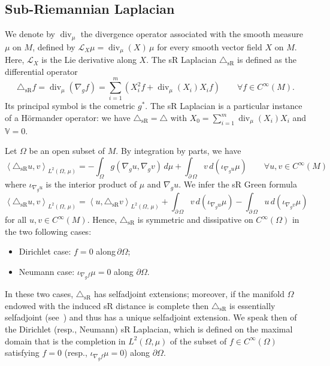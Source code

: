 \documentclass[AHL,Unicode,published]{cedram}
\newcommand{\bbV}{\mathbb{V}}
\newcommand{\calL}{\mathcal{L}}
\DeclareMathOperator{\divl}{div}
\newcommand{\trianglesR}{\triangle_{\mathrm{sR}}}
\let\oldforall\forall
\renewcommand*{\forall}{\mathrel{\oldforall}}
\begin{document}
\subsection{Sub-Riemannian Laplacian}\label{sec_sRLaplacian}
We denote by $\divl_\mu$ the divergence operator associated with the smooth measure $\mu$ on $M$, defined by $\calL_X \mu=\divl_\mu(X)\, \mu$ for every smooth vector field $X$ on $M$. Here, $\calL_X$ is the Lie derivative along $X$. The sR Laplacian $\trianglesR$ is defined as the differential operator
\begin{equation}\label{def_DeltasR}
\trianglesR f = \divl_\mu\left(\nabla_g f\right) = \sum_{i=1}^m \left(X_i^2f + \divl_\mu(X_i)X_if \right) \qquad \forall f\in C^\infty(M).
\end{equation}
Its principal symbol is the cometric $g^*$. The sR Laplacian is a particular instance of a H\"ormander operator: we have $\trianglesR=\triangle$ with $X_0 = \sum_{i=1}^m \divl_\mu(X_i)X_i$ and $\bbV=0$.

Let $\Omega$ be an open subset of $M$. By integration by parts, we have
\[
\left\langle \trianglesR u,v\right\rangle_{L^2(\Omega,\,\mu)} = - \int_\Omega g\left(\nabla_g u,\nabla_g v\right)\, d\mu + \int_{\partial\,\Omega} v\, d\left(\iota_{\nabla_gu}\mu\right) \qquad \forall u,v\in C^\infty(M)
\]
where $\iota_{\nabla_gu}$ is the interior product of $\mu$ and $\nabla_gu$. We infer the sR Green formula
\[
\left\langle \trianglesR u,v\right\rangle_{L^2(\Omega,\,\mu)} = \left\langle u,\trianglesR v\right\rangle_{L^2(\Omega,\,\mu)} + \int_{\partial\,\Omega} v\, d\left(\iota_{\nabla_gu}\mu\right) - \int_{\partial\,\Omega} u\, d\left(\iota_{\nabla_gv} \mu\right)
\]
for all $u,v\in C^\infty(M)$. Hence, $\trianglesR$ is symmetric and dissipative on $C^\infty(\Omega)$ in the two following cases:
\begin{itemize}
\item Dirichlet case: $f=0$ along\,$\partial\Omega$;
\item Neumann case: $\iota_{\nabla_gf}\mu=0$ along $\partial\Omega$.
\end{itemize}
In these two cases, $\trianglesR$ has selfadjoint extensions; moreover, if the manifold $\Omega$ endowed with the induced sR distance is complete then $\trianglesR$ is essentially selfadjoint (see~\cite{Strichartz_JDG1986}) and thus has a unique selfadjoint extension. We speak then of the Dirichlet (resp., Neumann) sR Laplacian, which is defined on the maximal domain that is the completion in $L^2(\Omega,\mu)$ of the subset of $f\in C^\infty(\Omega)$ satisfying $f=0$ (resp., $\iota_{\nabla_gf}\mu=0$) along $\partial\Omega$.
\end{document}
